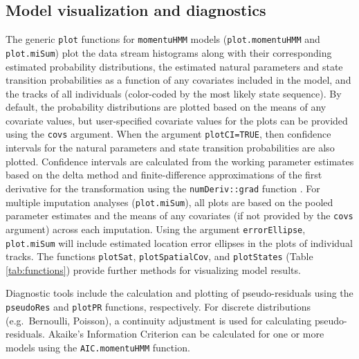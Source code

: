 \documentclass[12pt]{article}\usepackage[]{graphicx}\usepackage[]{color}
\begin{document}
\subsection{Model visualization and diagnostics}
The generic \verb|plot| functions for \verb|momentuHMM| models (\verb|plot.momentuHMM| and \verb|plot.miSum|) plot the data stream histograms along with their corresponding estimated probability distributions, the estimated natural parameters and state transition probabilities as a function of any covariates included in the model, and the tracks of all individuals (color-coded by the most likely state sequence). By default, the probability distributions are plotted based on the means of any covariate values, but user-specified covariate values for the plots can be provided using the \verb|covs| argument.  When the argument \verb|plotCI=TRUE|, then confidence intervals for the natural parameters and state transition probabilities are also plotted. Confidence intervals are calculated from the working parameter estimates based on the delta method and finite-difference approximations of the first derivative for the transformation using the \verb|numDeriv::grad| function \citep{GilbertVaradhan2016}.  For multiple imputation analyses (\verb|plot.miSum|), all plots are based on the pooled parameter estimates and the means of any covariates (if not provided by the \verb|covs| argument) across each imputation. Using the argument \verb|errorEllipse|, \verb|plot.miSum| will include estimated location error ellipses in the plots of individual tracks. The functions \verb|plotSat|, \verb|plotSpatialCov|, and \verb|plotStates| (Table \ref{tab:functions}) provide further methods for visualizing model results.

Diagnostic tools include the calculation and plotting of pseudo-residuals \citep{ZucchiniEtAl2016} using the \verb|pseudoRes| and \verb|plotPR| functions, respectively. For discrete distributions (e.g.\ Bernoulli, Poisson), a continuity adjustment is used for calculating pseudo-residuals. Akaike's Information Criterion can be calculated for one or more models using the \verb|AIC.momentuHMM| function.
\end{document}
